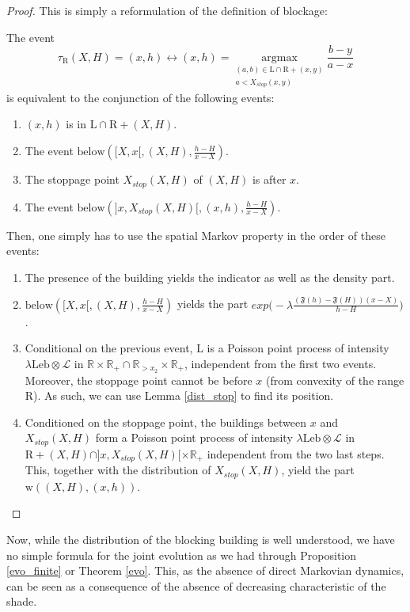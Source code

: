 \documentclass[10pt,english,a4paper]{smfart}
\theoremstyle{definition}
\theoremstyle{remark}
\newcommand{\R}{\mathbb{R}}
\newcommand{\Leb}{\mathrm{Leb}}
\newcommand{\landsc}{\mathrm{L}}
\newcommand{\Half}{\R \times \R_+}
\newcommand{\below}[3]{\mathrm{below}\left(#1, #2, #3\right)}
\newcommand{\primi}{\mathfrak{F}}
\newcommand{\placehold}{\mathrm{w}}
\begin{document}
\begin{proof}
This is simply a reformulation of the definition of blockage:

The event
\[\tau_{\mathrm{R}}(X, H) = (x, h)\leftrightarrow (x, h) = \underset{\substack{(a, b) \in \landsc\cap \mathrm{R}+(x, y) \\a<X_{stop}(x, y)}}{\text{argmax}} \frac{b-y}{a-x}\]
is equivalent to the conjunction of the following events:
\begin{enumerate}
    \item $(x, h)$ is in $\landsc\cap\mathrm{R}+(X, H)$.
    \item The event $\below{[X, x[}{(X, H)}{\frac{h-H}{x-X}}$.
    \item The stoppage point $X_{stop}(X, H)$ of $(X, H)$ is after $x$.
    \item The event $\below{]x, X_{stop}(X, H)[}{(x, h)}{\frac{h-H}{x-X}}$.
\end{enumerate}
Then, one simply has to use the spatial Markov property in the order of these events:
\begin{enumerate}
    \item The presence of the building yields the indicator as well as the density part.
    \item $\below{[X, x[}{(X, H)}{\frac{h-H}{x-X}}$ yields the part $exp\Biggl(-\lambda\frac{(\primi(h)-\primi(H))(x-X)}{h-H}\Biggl)$.
    \item Conditional on the previous event, $\landsc$ is a Poisson point process of intensity $\lambda\Leb \otimes \mathcal{L}$ in $\Half\cap \R_{> x_2}\times \R_+$, independent from the first two events. Moreover, the stoppage point cannot be before $x$ (from convexity of the range $\mathrm{R}$). As such, we can use Lemma \ref{dist_stop} to find its position.
    \item Conditioned on the stoppage point, the buildings between $x$ and $X_{stop}(X, H)$ form a Poisson point process of intensity $\lambda\Leb \otimes \mathcal{L}$ in $\mathrm{R}+(X, H)\cap ]x, X_{stop}(X, H)[\times \R_+$ independent from the two last steps. This, together with the distribution of $X_{stop}(X, H)$, yield the part $\placehold((X, H), (x, h))$.
\end{enumerate}
\end{proof}

Now, while the distribution of the blocking building is well understood, we have no simple formula for the joint evolution as we had through Proposition \ref{evo_finite} or Theorem \ref{evo}. This, as the absence of direct Markovian dynamics, can be seen as a consequence of the absence of decreasing characteristic of the shade. 
\end{document}
